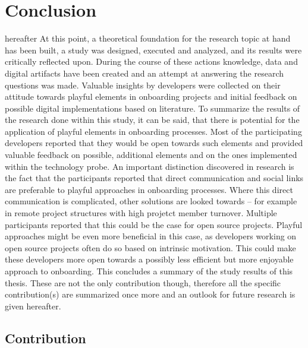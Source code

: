 \section{Conclusion}
hereafter
At this point, a theoretical foundation for the research topic at hand has been built, a study was designed, executed and analyzed, and its results were critically reflected upon. During the course of these actions knowledge, data and digital artifacts have been created and an attempt at answering the research questions was made. Valuable insights by developers were collected on their attitude towards playful elements in onboarding projects and initial feedback on possible digital implementations based on literature. To summarize the results of the research done within this study, it can be said, that there is potential for the application of playful elements in onboarding processes. Most of the participating developers reported that they would be open towards such elements and provided valuable feedback on possible, additional elements and on the ones implemented within the technology probe. An important distinction discovered in research is the fact that the participants reported that direct communication and social links are preferable to playful approaches in onboarding processes. Where this direct communication is complicated, other solutions are looked towards -- for example in remote project structures with high projetct member turnover. Multiple participants reported that this could be the case for open source projects. Playful approaches might be even more beneficial in this case, as developers working on open source projects often do so based on intrinsic motivation. This could make these developers more open towards a possibly less efficient but more enjoyable approach to onboarding. This concludes a summary of the study results of this thesis. These are not the only contribution though, therefore all the specific contribution(s) are summarized once more and an outlook for future research is given hereafter.

\subsection{Contribution}

